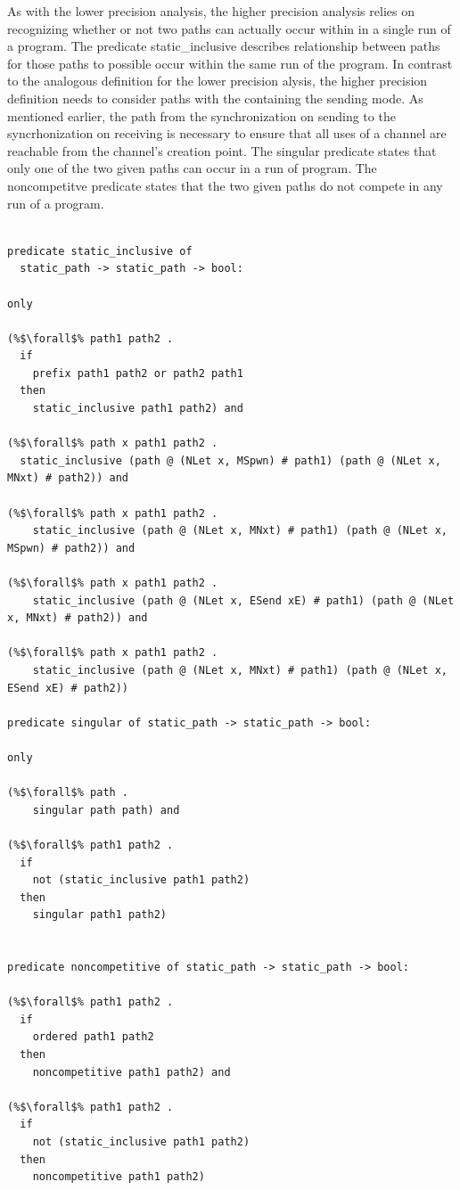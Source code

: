 \documentclass{article}
\begin{document}
As with the lower precision analysis, the higher precision analysis relies on recognizing
whether or not two paths can actually occur within in a single run of a program.  The predicate
static\_inclusive describes relationship between paths for those paths to possible occur within
the same run of the program.  In contrast to the analogous definition for the lower precision
alysis, the higher precision definition needs to consider paths with the containing the
sending mode.  As mentioned earlier, the path from the synchronization on sending to the
syncrhonization on receiving is necessary to ensure that all uses of a channel are reachable
from the channel's creation point.  The singular predicate states that only one of the two
given paths can occur in a run of program.  The noncompetitve predicate states that the two
given paths do not compete in any run of a program. 


\begin{lstlisting}[language=logic, escapechar=\%]

predicate static_inclusive of
  static_path -> static_path -> bool:

only

(%$\forall$% path1 path2 .
  if
    prefix path1 path2 or path2 path1
  then
    static_inclusive path1 path2) and

(%$\forall$% path x path1 path2 .
  static_inclusive (path @ (NLet x, MSpwn) # path1) (path @ (NLet x, MNxt) # path2)) and

(%$\forall$% path x path1 path2 .
    static_inclusive (path @ (NLet x, MNxt) # path1) (path @ (NLet x, MSpwn) # path2)) and

(%$\forall$% path x path1 path2 .
    static_inclusive (path @ (NLet x, ESend xE) # path1) (path @ (NLet x, MNxt) # path2)) and

(%$\forall$% path x path1 path2 .
    static_inclusive (path @ (NLet x, MNxt) # path1) (path @ (NLet x, ESend xE) # path2))

predicate singular of static_path -> static_path -> bool:

only 

(%$\forall$% path .
    singular path path) and

(%$\forall$% path1 path2 .
  if
    not (static_inclusive path1 path2)
  then
    singular path1 path2)


predicate noncompetitive of static_path -> static_path -> bool:

(%$\forall$% path1 path2 . 
  if
    ordered path1 path2
  then
    noncompetitive path1 path2) and

(%$\forall$% path1 path2 .
  if
    not (static_inclusive path1 path2)
  then
    noncompetitive path1 path2)
  \end{lstlisting}
\end{document}
